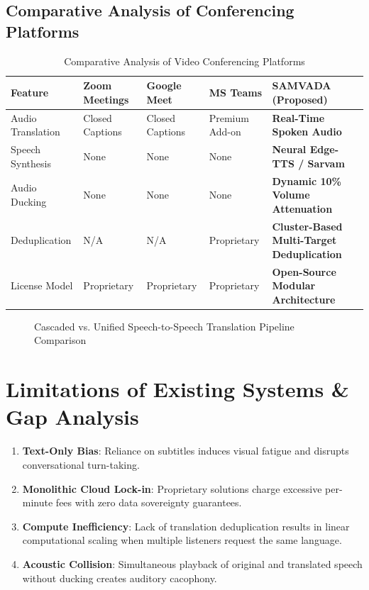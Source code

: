 \documentclass[12pt,a4paper]{report}
\begin{document}
\subsection{Comparative Analysis of Conferencing Platforms}

\begin{table}[H]
\centering
\small
\caption{Comparative Analysis of Video Conferencing Platforms}
\label{tab:comp_platforms}
\begin{tabularx}{\textwidth}{lXXXX}
\toprule
\textbf{Feature} & \textbf{Zoom Meetings} & \textbf{Google Meet} & \textbf{MS Teams} & \textbf{SAMVADA (Proposed)} \\
\midrule
Audio Translation & Closed Captions & Closed Captions & Premium Add-on & \textbf{Real-Time Spoken Audio} \\
Speech Synthesis & None & None & None & \textbf{Neural Edge-TTS / Sarvam} \\
Audio Ducking & None & None & None & \textbf{Dynamic 10\% Volume Attenuation} \\
Deduplication & N/A & N/A & Proprietary & \textbf{Cluster-Based Multi-Target Deduplication} \\
License Model & Proprietary & Proprietary & Proprietary & \textbf{Open-Source Modular Architecture} \\
\bottomrule
\end{tabularx}
\end{table}

\begin{figure}[H]
  \centering
  \caption{Cascaded vs. Unified Speech-to-Speech Translation Pipeline Comparison}
  \label{fig:fig2_1}
\end{figure}

\section{Limitations of Existing Systems \& Gap Analysis}
\begin{enumerate}
    \item \textbf{Text-Only Bias}: Reliance on subtitles induces visual fatigue and disrupts conversational turn-taking.
    \item \textbf{Monolithic Cloud Lock-in}: Proprietary solutions charge excessive per-minute fees with zero data sovereignty guarantees.
    \item \textbf{Compute Inefficiency}: Lack of translation deduplication results in linear computational scaling when multiple listeners request the same language.
    \item \textbf{Acoustic Collision}: Simultaneous playback of original and translated speech without ducking creates auditory cacophony.
\end{enumerate}
\end{document}
